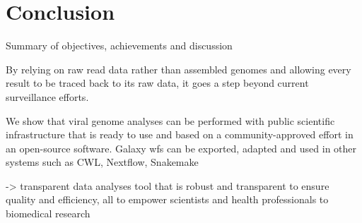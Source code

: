 \chapter{Conclusion}\label{chap:conclusion}
\todoit
Summary of objectives, achievements and discussion

By relying on raw read data rather than assembled genomes and allowing every result to be traced back to its raw data, it goes a step beyond current surveillance efforts.

We show that viral genome analyses can be performed with public scientific infrastructure that is ready to use and based on a community-approved effort in an open-source software.
Galaxy wfs can be exported, adapted and used in other systems such as CWL, Nextflow, Snakemake

-> transparent data analyses tool that is robust and transparent to ensure quality and efficiency, all to empower scientists and health professionals to biomedical research